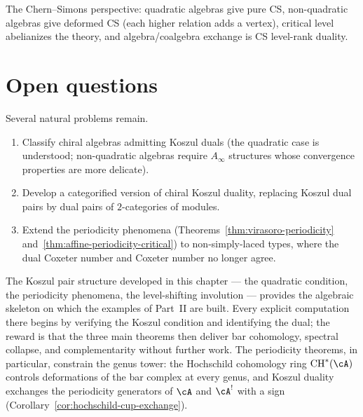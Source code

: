The Chern--Simons perspective: quadratic algebras give pure CS, non-quadratic algebras give deformed CS (each higher relation adds a vertex), critical level abelianizes the theory, and algebra/coalgebra exchange is CS level-rank duality.

\section{Open questions}

Several natural problems remain.
\begin{enumerate}
\item Classify chiral algebras admitting Koszul duals (the quadratic
case is understood; non-quadratic algebras require $A_\infty$ structures
whose convergence properties are more delicate).
\item Develop a categorified version of chiral Koszul duality, replacing
Koszul dual pairs by dual pairs of $2$-categories of modules.
\item Extend the periodicity phenomena
(Theorems~\ref{thm:virasoro-periodicity}
and~\ref{thm:affine-periodicity-critical}) to non-simply-laced types,
where the dual Coxeter number and Coxeter number no longer agree.
\end{enumerate}

\medskip

The Koszul pair structure developed in this chapter --- the quadratic condition, the periodicity phenomena, the level-shifting involution --- provides the algebraic skeleton on which the examples of Part~II are built.  Every explicit computation there begins by verifying the Koszul condition and identifying the dual; the reward is that the three main theorems then deliver bar cohomology, spectral collapse, and complementarity without further work.  The periodicity theorems, in particular, constrain the genus tower: the Hochschild cohomology ring $\mathrm{CH}^*(\cA)$ controls deformations of the bar complex at every genus, and Koszul duality exchanges the periodicity generators of $\cA$ and $\cA^!$ with a sign (Corollary~\ref{cor:hochschild-cup-exchange}).
